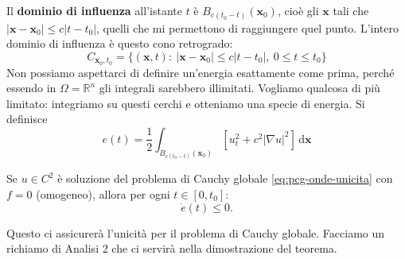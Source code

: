 \documentclass[10pt,a4paper,twoside,openright]{book}
\newcommand{\x}{\mathbf{x}}
\newcommand{\de}{\,\mathrm d}
\newcommand{\dxx}{\de \x}
\begin{document}
Il \textbf{dominio di influenza} all'istante $t$ è $B_{c(t_{0} -t)}(\x_{0})$, cioè gli $\x$ tali che $| \x -\x_{0}| \leqslant c| t-t_{0}| $, quelli che mi permettono di raggiungere quel punto. L'intero dominio di influenza è questo cono retrogrado:
\begin{equation}
	C_{\x_{0} ,t_{0}} =\{(\x ,t) :\ | \x -\x_{0}| \leqslant c| t-t_{0}| ,\ 0\leqslant t\leqslant t_{0}\}
\end{equation}
Non possiamo aspettarci di definire un'energia esattamente come prima, perché essendo in $\Omega =\mathbb{R}^{n}$ gli integrali sarebbero illimitati. Vogliamo qualcosa di più limitato: integriamo su questi cerchi e otteniamo una specie di energia. Si definisce
\begin{equation}
	e(t) =\frac{1}{2}\int _{B_{c(t_{0} -t)}(\x_{0})}\left[ u_{t}^{2} +c^{2}| \nabla u| ^{2}\right] \dxx
	\label{eq:onde-energia-pcg}
\end{equation}
\begin{theorem}
	Se $u\in C^{2}$ è soluzione del problema di Cauchy globale \eqref{eq:pcg-onde-unicita} con $f=0$ (omogeneo), allora per ogni $t\in [ 0,t_{0}]$:
	\begin{equation}
		\dot{e}(t) \leqslant 0.
	\end{equation}
\end{theorem}
Questo ci assicurerà l'unicità per il problema di Cauchy globale.
Facciamo un richiamo di Analisi 2 che ci servirà nella dimostrazione del teorema.
\end{document}
